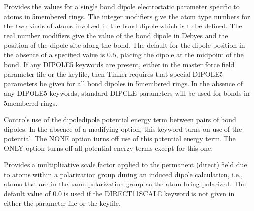 \documentclass[letterpaper,11pt,english]{sphinxmanual}
\begin{document}
\ignorespaces {}\label{\detokenize{text/keywords:key-dipole5}}\begin{description}
\sphinxAtStartPar
Provides the values for a single bond dipole electrostatic parameter specific to atoms in 5\sphinxhyphen{}membered rings. The integer modifiers give the atom type numbers for the two kinds of atoms involved in the bond dipole which is to be defined. The real number modifiers give the value of the bond dipole in Debyes and the position of the dipole site along the bond. The default for the dipole position in the absence of a specified value is 0.5, placing the dipole at the midpoint of the bond. If any DIPOLE5 keywords are present, either in the master force field parameter file or the keyfile, then Tinker requires that special DIPOLE5 parameters be given for all bond dipoles in 5\sphinxhyphen{}membered rings. In the absence of any DIPOLE5 keywords, standard DIPOLE parameters will be used for bonds in 5\sphinxhyphen{}membered rings.

\end{description}

\ignorespaces {}\label{\detokenize{text/keywords:key-dipoleterm}}\begin{description}
\sphinxAtStartPar
Controls use of the dipole\sphinxhyphen{}dipole potential energy term between pairs of bond dipoles. In the absence of a modifying option, this keyword turns on use of the potential. The NONE option turns off use of this potential energy term. The ONLY option turns off all potential energy terms except for this one.

\end{description}

\ignorespaces {}\label{\detokenize{text/keywords:key-direct-11-scale}}\begin{description}
\sphinxAtStartPar
Provides a multiplicative scale factor applied to the permanent (direct) field due to atoms within a polarization group during an induced dipole calculation, i.e., atoms that are in the same polarization group as the atom being polarized. The default value of 0.0 is used if the DIRECT\sphinxhyphen{}11\sphinxhyphen{}SCALE keyword is not given in either the parameter file or the keyfile.

\end{description}
\end{document}
